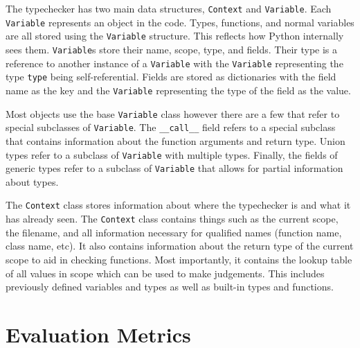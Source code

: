 \documentclass[10pt,twocolumn]{article}
\begin{document}
The typechecker has two main data structures, \verb|Context| and \verb|Variable|. Each \verb|Variable| represents an object in the code. Types, functions, and normal variables are all stored using the \verb|Variable| structure. This reflects how Python internally sees them. \verb|Variable|s store their name, scope, type, and fields. Their type is a reference to another instance of a \verb|Variable| with the \verb|Variable| representing the type \verb|type| being self-referential. Fields are stored as dictionaries with the field name as the key and the \verb|Variable| representing the type of the field as the value.

Most objects use the base \verb|Variable| class however there are a few that refer to special subclasses of \verb|Variable|. The \verb|__call__| field refers to a special subclass that contains information about the function arguments and return type. Union types refer to a subclass of \verb|Variable| with multiple types. Finally, the fields of generic types refer to a subclass of \verb|Variable| that allows for partial information about types. 

The \verb|Context| class stores information about where the typechecker is and what it has already seen. The \verb|Context| class contains things such as the current scope, the filename, and all information necessary for qualified names (function name, class name, etc). It also contains information about the return type of the current scope to aid in checking functions. Most importantly, it contains the lookup table of all values in scope which can be used to make judgements. This includes previously defined variables and types as well as built-in types and functions.


\section{Evaluation Metrics}

\end{document}
